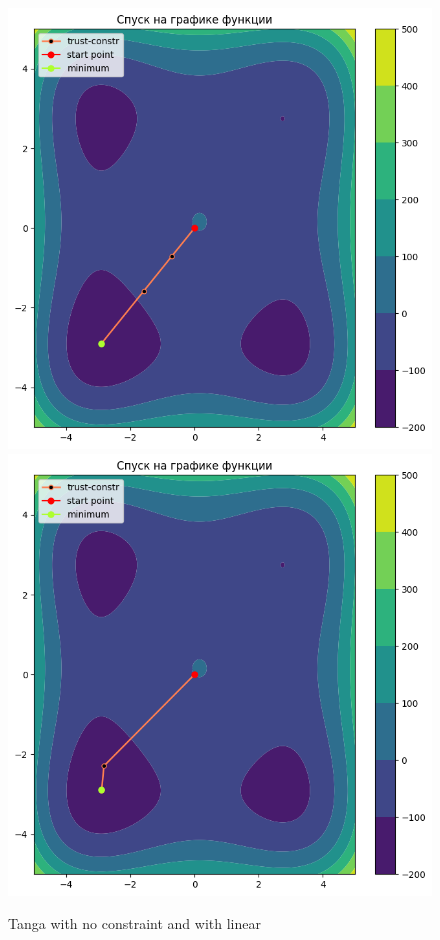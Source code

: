 \documentclass[12pt, a4paper, oneside, final]{article}
\begin{document}
	\begin{figure}[H]
		\centering
		\includegraphics[scale = 0.47]{Image/AT_TANGA_MINIMUM2_NO_CONSTRAINT.png}
		\includegraphics[scale = 0.47]{Image/AT_TANGA_MINIMUM2_LINEAR_CONSTRAINT.png}
		\caption*{Tanga with no constraint and with linear}
	\end{figure}
\end{document}
